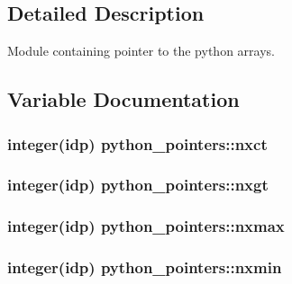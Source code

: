 \subsection{Detailed Description}
Module containing pointer to the python arrays. 

\subsection{Variable Documentation}
\subsubsection[{\texorpdfstring{nxct}{nxct}}]{\setlength{\rightskip}{0pt plus 5cm}integer(idp) python\+\_\+pointers\+::nxct}\hypertarget{namespacepython__pointers_a75ab930be0836b533be53654ce5e7e94}{}\label{namespacepython__pointers_a75ab930be0836b533be53654ce5e7e94}
\subsubsection[{\texorpdfstring{nxgt}{nxgt}}]{\setlength{\rightskip}{0pt plus 5cm}integer(idp) python\+\_\+pointers\+::nxgt}\hypertarget{namespacepython__pointers_ae4f4f06a80f2084571ee0a1f4b3348c3}{}\label{namespacepython__pointers_ae4f4f06a80f2084571ee0a1f4b3348c3}
\subsubsection[{\texorpdfstring{nxmax}{nxmax}}]{\setlength{\rightskip}{0pt plus 5cm}integer(idp) python\+\_\+pointers\+::nxmax}\hypertarget{namespacepython__pointers_a430f791c79026fff09c2ba1b34826ca4}{}\label{namespacepython__pointers_a430f791c79026fff09c2ba1b34826ca4}
\subsubsection[{\texorpdfstring{nxmin}{nxmin}}]{\setlength{\rightskip}{0pt plus 5cm}integer(idp) python\+\_\+pointers\+::nxmin}\hypertarget{namespacepython__pointers_a7354ad2c641955bc8b9dfed923d3131f}{}\label{namespacepython__pointers_a7354ad2c641955bc8b9dfed923d3131f}
